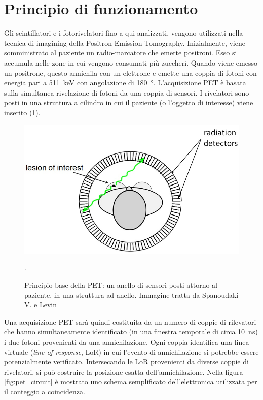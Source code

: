 \section{Principio di funzionamento}
Gli scintillatori e i fotorivelatori fino a qui analizzati, vengono utilizzati nella tecnica di imagining della Positron Emission Tomography. Inizialmente, viene somministrato al paziente un radio-marcatore che emette positroni. Esso si accumula nelle zone in cui vengono consumati più zuccheri. Quando viene emesso un positrone, questo annichila con un elettrone e emette una coppia di fotoni con energia pari a \SI{511}{\kilo\electronvolt} con angolazione di \SI{180}{\degree}. L'acquisizione PET è basata sulla simultanea rivelazione di fotoni da una coppia di sensori. I rivelatori sono posti in una struttura a cilindro in cui il paziente (o l'oggetto di interesse) viene inserito (\Fig\ref{fig:pet}).
\begin{figure}[tbh]
	\centering
	\includegraphics[width=0.6\linewidth]{./ImageFiles/PET.jpg}
	\caption{Principio base della PET: un anello di sensori posti attorno al paziente, in una struttura ad anello. Immagine tratta da Spanoudaki V. e Levin \cite{Spanoudaki2010}}. 
	\label{fig:pet}
\end{figure} 
Una acquisizione PET sarà quindi costituita da un numero di coppie di rilevatori che hanno simultaneamente identificato (in una finestra temporale di circa \SI{10}{\nano\second}) i due fotoni provenienti da una annichilazione. Ogni coppia identifica una linea virtuale (\textit{line of response}, LoR) in cui l'evento di annichilazione si potrebbe essere potenzialmente verificato. Intersecando le LoR provenienti da diverse coppie di rivelatori, si può costruire la posizione esatta dell'annichilazione. Nella figura \ref{fig:pet_circuit} è mostrato uno schema semplificato dell'elettronica utilizzata per il conteggio a coincidenza.
